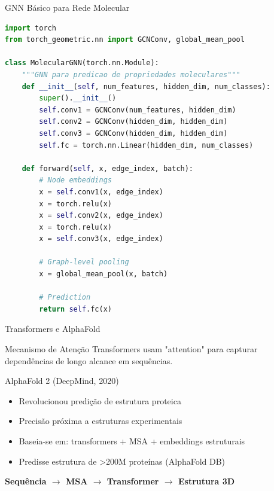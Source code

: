 \begin{frame}[fragile]{GNN Básico para Rede Molecular}
\begin{lstlisting}[language=Python, caption=GNN com PyTorch Geometric, basicstyle=\ttfamily\footnotesize]
import torch
from torch_geometric.nn import GCNConv, global_mean_pool

class MolecularGNN(torch.nn.Module):
    """GNN para predicao de propriedades moleculares"""
    def __init__(self, num_features, hidden_dim, num_classes):
        super().__init__()
        self.conv1 = GCNConv(num_features, hidden_dim)
        self.conv2 = GCNConv(hidden_dim, hidden_dim)
        self.conv3 = GCNConv(hidden_dim, hidden_dim)
        self.fc = torch.nn.Linear(hidden_dim, num_classes)

    def forward(self, x, edge_index, batch):
        # Node embeddings
        x = self.conv1(x, edge_index)
        x = torch.relu(x)
        x = self.conv2(x, edge_index)
        x = torch.relu(x)
        x = self.conv3(x, edge_index)

        # Graph-level pooling
        x = global_mean_pool(x, batch)

        # Prediction
        return self.fc(x)
\end{lstlisting}
\end{frame}

\begin{frame}{Transformers e AlphaFold}
\begin{block}{Mecanismo de Atenção}
Transformers usam "attention" para capturar dependências de longo alcance em sequências.
\end{block}

\begin{exampleblock}{AlphaFold 2 (DeepMind, 2020)}
\begin{itemize}
    \item Revolucionou predição de estrutura proteica
    \item Precisão próxima a estruturas experimentais
    \item Baseia-se em: transformers + MSA + embeddings estruturais
    \item Predisse estrutura de \textgreater200M proteínas (AlphaFold DB)
\end{itemize}
\end{exampleblock}

\vspace{0.3cm}


\textbf{Sequência $\rightarrow$ MSA $\rightarrow$ Transformer $\rightarrow$ Estrutura 3D}
\end{frame}

